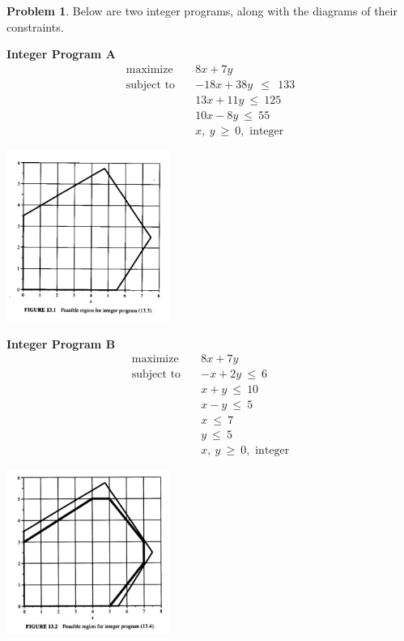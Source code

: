 \documentclass[11pt]{article}
\theoremstyle{definition}
\newtheorem{problem}{Problem}
\newcommand{\maximize}{\text{maximize}}
\newcommand{\subjectto}{\text{subject to}}
\begin{document}
\begin{problem}  
Below are two integer programs, along with the diagrams of their constraints.

\begin{multicols}{2}

{\bf Integer Program A}
\begin{align*}
      \maximize \quad & 8x + 7y \\
      \subjectto \quad & -18x + 38y ~~\leq~~ 133\\
                       & 13x + 11y ~\leq~ 125\\
                       & 10x - 8y ~\leq~ 55\\
                       & x,~y ~\geq~ 0, \text{ integer}
\end{align*}
\vspace{6cm}

\includegraphics[width = 0.4\textwidth]{formulation_bad}
\end{multicols}

\begin{multicols}{2}

{\bf Integer Program B}
\begin{align*}
      \maximize \quad & 8x + 7y \\
      \subjectto \quad & -x+2y ~\leq~ 6\\
                       & x + y ~\leq~ 10\\
                       & x - y ~\leq~ 5\\
                       & x ~\leq~ 7\\
                       & y ~\leq~ 5\\
                       & x,~y ~\geq~ 0, \text{ integer}
\end{align*}
\vspace{6cm}

\includegraphics[width = 0.4\textwidth]{formulation_ideal}
\end{multicols}


\end{problem}
\end{document}
